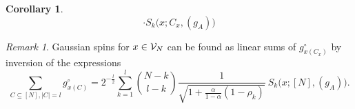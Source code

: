 \documentclass[preprint,11pt]{elsarticle}
\newtheorem{Corollary}{Corollary}
\theoremstyle{remark}
\newtheorem{Remark}{Remark}
\begin{document}
{\begin{Corollary}
\begin{equation}
\cdot S_k\big (x;C_x,(g_A)\big )
\label{exchcirc:00}
\end{equation}
%
\end{Corollary}
\begin{Remark}
Gaussian spins for $x\in {\cal V}_N$ can be found as linear sums of $g^\circ_{x(C_x)}$ by inversion of the expressions
\begin{equation*}
\sum_{C \subseteq [N], |C|=l}g^\circ_{x(C)}
= 2^{-\frac{l}{2}}\sum_{k=1}^l{N-k\choose l-k}\frac {1}{\sqrt { 1 + \frac{\alpha}{1-\alpha}(1-\rho_k)}}
\ S_k\big (x;[N],(g_A)\big ).
\label{spin:354}
\end{equation*}
\end{Remark}

}
\end{document}
